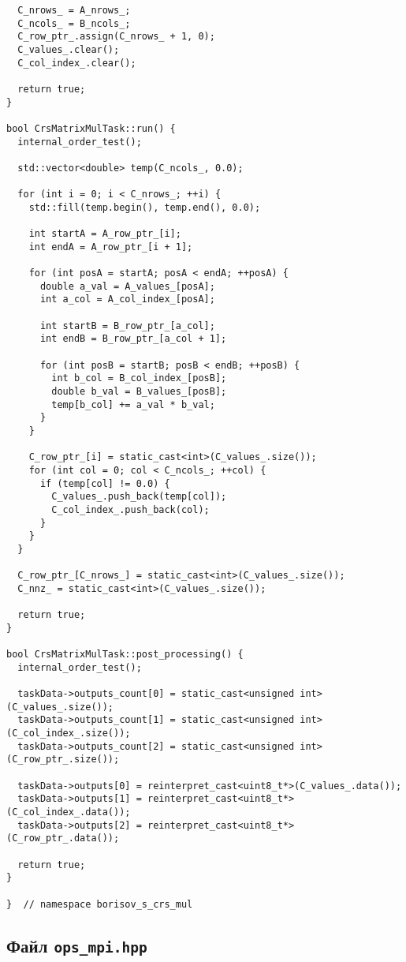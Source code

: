\documentclass[12pt]{article}
\begin{document}
\begin{lstlisting}
  C_nrows_ = A_nrows_;
  C_ncols_ = B_ncols_;
  C_row_ptr_.assign(C_nrows_ + 1, 0);
  C_values_.clear();
  C_col_index_.clear();

  return true;
}

bool CrsMatrixMulTask::run() {
  internal_order_test();

  std::vector<double> temp(C_ncols_, 0.0);

  for (int i = 0; i < C_nrows_; ++i) {
    std::fill(temp.begin(), temp.end(), 0.0);

    int startA = A_row_ptr_[i];
    int endA = A_row_ptr_[i + 1];

    for (int posA = startA; posA < endA; ++posA) {
      double a_val = A_values_[posA];
      int a_col = A_col_index_[posA];

      int startB = B_row_ptr_[a_col];
      int endB = B_row_ptr_[a_col + 1];

      for (int posB = startB; posB < endB; ++posB) {
        int b_col = B_col_index_[posB];
        double b_val = B_values_[posB];
        temp[b_col] += a_val * b_val;
      }
    }

    C_row_ptr_[i] = static_cast<int>(C_values_.size());
    for (int col = 0; col < C_ncols_; ++col) {
      if (temp[col] != 0.0) {
        C_values_.push_back(temp[col]);
        C_col_index_.push_back(col);
      }
    }
  }

  C_row_ptr_[C_nrows_] = static_cast<int>(C_values_.size());
  C_nnz_ = static_cast<int>(C_values_.size());

  return true;
}

bool CrsMatrixMulTask::post_processing() {
  internal_order_test();

  taskData->outputs_count[0] = static_cast<unsigned int>(C_values_.size());
  taskData->outputs_count[1] = static_cast<unsigned int>(C_col_index_.size());
  taskData->outputs_count[2] = static_cast<unsigned int>(C_row_ptr_.size());

  taskData->outputs[0] = reinterpret_cast<uint8_t*>(C_values_.data());
  taskData->outputs[1] = reinterpret_cast<uint8_t*>(C_col_index_.data());
  taskData->outputs[2] = reinterpret_cast<uint8_t*>(C_row_ptr_.data());

  return true;
}

}  // namespace borisov_s_crs_mul
\end{lstlisting}

\subsection*{Файл \texttt{ops\_mpi.hpp}}
\end{document}
